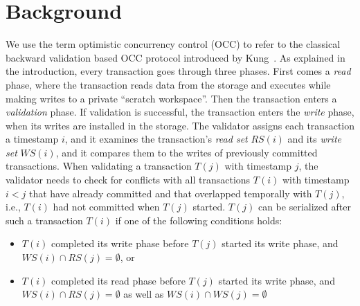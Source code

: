 \section{Background}\label{sec:background}

We use the term optimistic concurrency control (OCC) to refer to the classical backward validation based OCC protocol introduced by Kung~\cite{kung81tods}.
As explained in the introduction, every transaction goes through three phases. First comes a \emph{read} phase, where the transaction reads data from the storage and executes while making writes to a private ``scratch workspace''. Then the transaction enters a \emph{validation} phase. If validation is successful, the transaction enters the \emph{write} phase, when its writes are installed in the storage. 
The validator assigns each transaction a timestamp $i$, and it examines the transaction's \emph{read set} $RS(i)$ and its \emph{write set} $WS(i)$, and it compares them to the writes of previously committed transactions. 
When validating a transaction $T(j)$ with timestamp $j$, the validator needs to check for conflicts with all transactions $T(i)$ with timestamp $i<j$ that have already committed and that overlapped temporally with $T(j)$, i.e., $T(i)$ had not committed when $T(j)$ started. 
$T(j)$ can be serialized after such a transaction $T(i)$ if one of the following conditions holds:
\begin{itemize}
\vspace{-.5em}
\item $T(i)$ completed its write phase before $T(j)$ started its write phase, and $WS(i) \cap RS(j) = \emptyset$, or
\vspace{-.5em}
\item $T(i)$ completed its read phase before $T(j)$ started its write phase, and $WS(i) \cap RS(j) = \emptyset$ as well as $WS(i) \cap WS(j) = \emptyset$
\vspace{-.5em}
\end{itemize}
